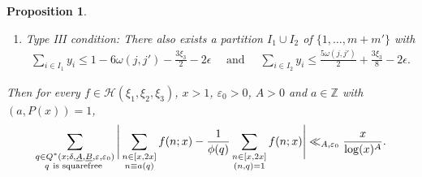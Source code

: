 \documentclass{amsart}
\newtheorem{prop}{Proposition}
\numberwithin{equation}{section}
\begin{document}
\begin{prop}
\begin{enumerate}[{\rm (A)}]
\begin{align*}
    &\sum_{i \in I_4} y_i \leq   8\omega_0 .
\end{align*} 
\item Type III condition: There also exists a partition $I_1 \cup I_2$ of $\{1, \dots, m+m'\}$ with  
\begin{align*}
\sum_{i \in I_1} y_i \leq  1- 6\omega(j,j') -\frac{3\xi_3}{2}-2\epsilon \quad \mbox{ and } \quad  \sum_{i \in I_2} y_i \leq    \frac{5\omega(j,j')}{2} +\frac{3 \xi_3}{8}  -2\epsilon. 
\end{align*} 
\end{enumerate}
Then for every $f \in \mathcal{H}(\xi_1,\xi_2,\xi_3)$,  $x>1$, $\varepsilon_0 >0$, $A>0$ and    $a\in \mathbb{Z}$  with $(a,P(x))=1$,   
\begin{align*} 
\sum_{\substack{q \in Q^*(x;\delta,\underline{A},\underline{B},\varepsilon,\varepsilon_0) \\  q \mbox{ \scriptsize  is squarefree  }   }}  \Bigg| \sum_{\substack{n \in [x,2x] \\ n \equiv a (q)}} f(n;x) - \dfrac{1}{\phi(q)} \sum_{\substack{ n \in [x,2x] \\ (n,q)=1}}f(n;x) \Bigg| \ll_{A,\varepsilon_0} \dfrac{x}{\log(x)^A}.
\end{align*}
\end{prop}
\end{document}
